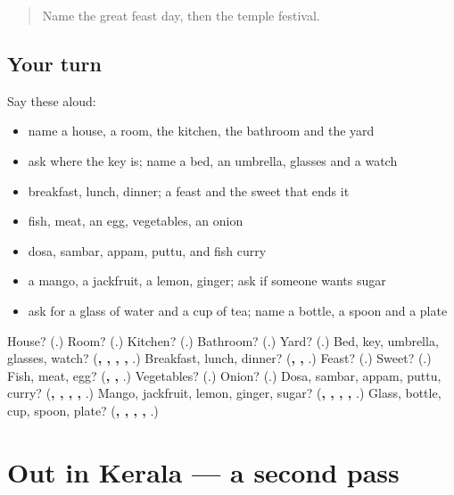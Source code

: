 \label{lesson:ML-R141-first-pass-home-food-table}



\begin{quote}
Name the great feast day, then the temple festival.
\end{quote}

\subsection*{Your turn}
Say these aloud:

\begin{itemize}
\raggedright
  \item name a house, a room, the kitchen, the bathroom and the yard
  \item ask where the key is; name a bed, an umbrella, glasses and a watch
  \item breakfast, lunch, dinner; a feast and the sweet that ends it
  \item fish, meat, an egg, vegetables, an onion
  \item dosa, sambar, appam, puttu, and fish curry
  \item a mango, a jackfruit, a lemon, ginger; ask if someone wants sugar
  \item ask for a glass of water and a cup of tea; name a bottle, a spoon and a plate
\end{itemize}

\begin{tcolorbox}[breakable,colback=teal!4,colframe=teal!35!black,title={Before you move on}]
House? (\textbf{}.) Room? (\textbf{}.) Kitchen? (\textbf{}.) Bathroom? (\textbf{}.) Yard? (\textbf{}.) Bed, key, umbrella, glasses, watch? (\textbf{, , , , }.) Breakfast, lunch, dinner? (\textbf{, , }.) Feast? (\textbf{}.) Sweet? (\textbf{}.) Fish, meat, egg? (\textbf{, , }.) Vegetables? (\textbf{}.) Onion? (\textbf{}.) Dosa, sambar, appam, puttu, curry? (\textbf{, , , , }.) Mango, jackfruit, lemon, ginger, sugar? (\textbf{, , , , }.) Glass, bottle, cup, spoon, plate? (\textbf{, , , , }.)
\end{tcolorbox}
\section[(dialogue)]{Out in Kerala — a second pass}

